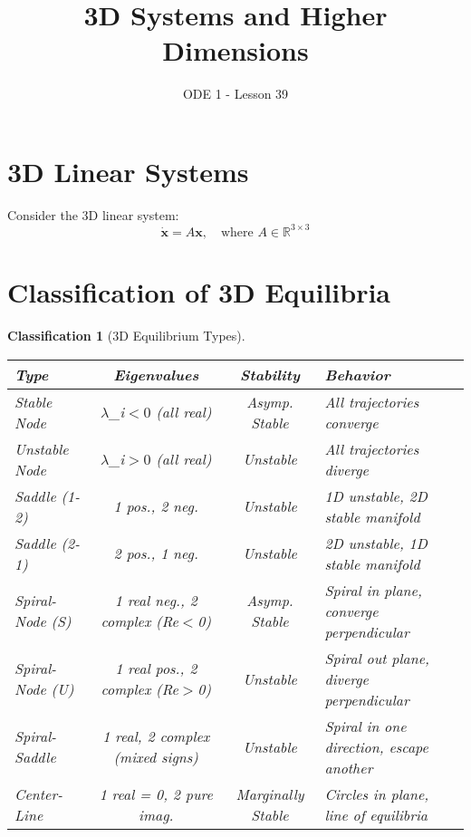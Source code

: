 \documentclass[12pt]{article}
\title{3D Systems and Higher Dimensions}
\author{ODE 1 - Lesson 39}
\date{}
\newtheorem{classification}{Classification}
\begin{document}
\maketitle

\section{3D Linear Systems}

Consider the 3D linear system:
$$\dot{\mathbf{x}} = A\mathbf{x}, \quad \text{where } A \in \mathbb{R}^{3 \times 3}$$


\section{Classification of 3D Equilibria}

\begin{classification}[3D Equilibrium Types]
\begin{center}
\begin{tabular}{|l|c|c|p{5cm}|}
\hline
\textbf{Type} & \textbf{Eigenvalues} & \textbf{Stability} & \textbf{Behavior} \\
\hline
\hline
Stable Node & $\lambda$_{i}$ < 0$ (all real) & Asymp. Stable & All trajectories converge \\
\hline
Unstable Node & $\lambda$_{i}$ > 0$ (all real) & Unstable & All trajectories diverge \\
\hline
Saddle (1-2) & 1 pos., 2 neg. & Unstable & 1D unstable, 2D stable manifold \\
\hline
Saddle (2-1) & 2 pos., 1 neg. & Unstable & 2D unstable, 1D stable manifold \\
\hline
Spiral-Node (S) & 1 real neg., 2 complex (Re$<$0) & Asymp. Stable & Spiral in plane, converge perpendicular \\
\hline
Spiral-Node (U) & 1 real pos., 2 complex (Re$>$0) & Unstable & Spiral out plane, diverge perpendicular \\
\hline
Spiral-Saddle & 1 real, 2 complex (mixed signs) & Unstable & Spiral in one direction, escape another \\
\hline
Center-Line & 1 real = 0, 2 pure imag. & Marginally Stable & Circles in plane, line of equilibria \\
\hline
\end{tabular}
\end{center}
\end{classification}
\end{document}
